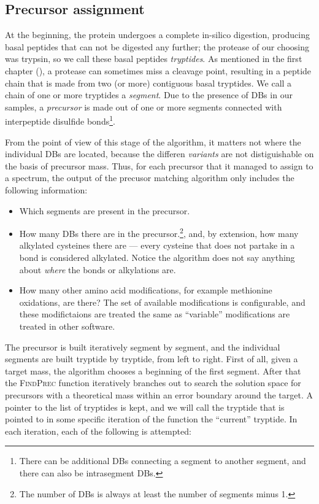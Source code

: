 \subsection{Precursor assignment}

At the beginning, the protein undergoes a complete in-silico digestion, producing basal peptides that can not be digested any further; the protease of our choosing was trypsin, so we call these basal peptides \emph{tryptides}. As mentioned in the first chapter (), a protease can sometimes miss a cleavage point, resulting in a peptide chain that is made from two (or more) contiguous basal tryptides. We call a chain of one or more tryptides a \emph{segment}. Due to the presence of DBs in our samples, a \emph{precursor} is made out of one or more segments connected with interpeptide disulfide bonds\footnote{There can be additional DBs connecting a segment to another segment, and there can also be intrasegment DBs.}.


From the point of view of this stage of the algorithm, it matters not where the individual DBs are located, because the differen \emph{variants} are not distiguishable on the basis of precursor mass. Thus, for each precursor that it managed to assign to a spectrum, the output of the precusor matching algorithm only includes the following information:

\begin{itemize}
  \item  Which segments are present in the precursor.
  \item How many DBs there are in the precursor.\footnote{The number of DBs is always at least the number of segments minus 1.}, and, by extension, how many alkylated cysteines there are --- every cysteine that does not partake in a bond is considered alkylated. Notice the algorithm does not say anything about \emph{where} the bonds or alkylations are.
  \item How many other amino acid modifications, for example methionine oxidations, are there? The set of available modifications is configurable, and these modifictaions are treated the same as ``variable'' modifications are treated in other software.
\end{itemize}


The precursor is built iteratively segment by segment, and the individual segments are built tryptide by tryptide, from left to right. First of all, given a target mass, the algorithm chooses a beginning of the first segment. After that the \textsc{FindPrec} function iteratively branches out to search the solution space for precursors with a theoretical mass within an error boundary around the target. A pointer to the list of tryptides is kept, and we will call the tryptide that is pointed to in some specific iteration of the function the ``current'' tryptide. In each iteration, each of the following is attempted:

